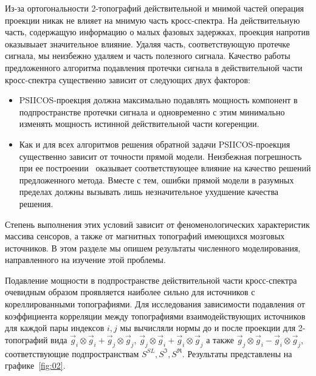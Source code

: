 Из-за ортогональности 2-топографий действительной и мнимой частей операция
проекции никак не влияет на мнимую часть кросс-спектра. На действительную
часть, содержащую информацию о малых фазовых задержках, проекция напротив
оказывыает значительное влияние.  Удаляя часть, соответствующую протечке
сигнала, мы неизбежно удаляем и часть полезного сигнала. Качество работы
предложенного алгоритма подавления протечки сигнала в действительной части
кросс-спектра существенно зависит от следующих двух факторов:

\begin{itemize}
    \item PSIICOS-проекция должна максимально подавлять мощность компонент в
        подпространстве протечки сигнала и одновременно с этим минимально
        изменять мощность истинной действительной части когеренции.
    \item Как и для всех алгоритмов решения обратной задачи PSIICOS-проекция
        существенно зависит от точности прямой модели. Неизбежная погрешность
        при ее построении~\cite{Mosher1999} оказывает соответствующее влияние
        на качество решений предложенного метода. Вместе с тем, ошибки прямой
        модели в разумных пределах должны вызывать лишь незначительное
        ухудшение качества решения.
\end{itemize}

Степень выполнения этих условий зависит от феноменологических характеристик
массива сенсоров, а также от магнитных топографий имеющихся мозговых
источников. В этом разделе мы опишем результаты численного моделирования,
направленного на изучение этой проблемы.

Подавление мощности в подпространстве действительной части кросс-спектра
очевидным образом проявляется наиболее сильно для источников с кореллированными
топографиями.  Для исследования зависимости подавления от коэффициента
корреляции между топографиями взаимодействующих источников для каждой пары
индексов $i, j$ мы вычисляли нормы до и после проекции для 2-топографий вида
$\vec{g}_i \otimes \vec{g}_i + \vec{g}_j \otimes \vec{g}_j$,
$\vec{g}_j\otimes\vec{g}_i + \vec{g}_i\otimes\vec{g}_j$ а также
$\vec{g}_j\otimes\vec{g}_i - \vec{g}_i\otimes\vec{g}_j$, соответствующие
подпространствам $S^{SL}, S^{\Im}, S^{\Re}$. Результаты представлены на графике~\ref{fig:02}.

